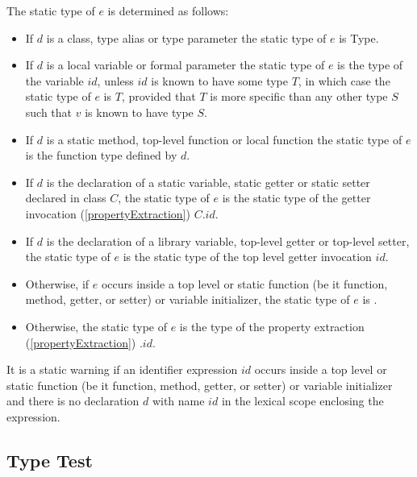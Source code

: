 \documentclass{article}
\newcommand{\code}[1]{{\sf #1}}
\begin{document}
\begin{itemize}
\LMHash{}
The static type of $e$ is determined as follows:

\begin{itemize}
\item If $d$ is a class, type alias or type parameter the static type of $e$ is \code{Type}.
\item If $d$ is a local variable or formal parameter the static type of $e$ is the type of the variable $id$, unless $id$ is known to have some type $T$, in which case the static type of $e$ is $T$, provided that $T$ is more specific than any other type $S$ such that $v$ is known to have type $S$.
\item If $d$ is a static method, top-level function or local function the static type of $e$ is the function type defined by $d$.
\item If $d$ is the declaration of a static variable, static getter or static setter declared in class $C$, the static type of $e$ is the static type of the getter invocation (\ref{propertyExtraction}) $C.id$.
\item If $d$ is the declaration of a library variable, top-level getter or top-level setter, the static type of $e$  is the static type of the top level getter invocation $id$.
\item Otherwise, if $e$ occurs inside a top level or static function (be it function, method, getter,  or setter) or variable initializer, the static type of $e$ is \DYNAMIC{}.
\item Otherwise, the static type of $e$ is the type of the property extraction (\ref{propertyExtraction}) \THIS{}.$id$.
\end{itemize}



\LMHash{}
It is a static warning if an identifier expression $id$ occurs inside a top level or static function (be it function, method, getter, or setter) or variable initializer and there is no declaration $d$ with name $id$ in the lexical scope enclosing the expression.

\subsection{ Type Test}


\end{itemize}
\end{document}
